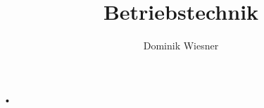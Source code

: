 \documentclass[12pt,a4paper]{article}
\author{Dominik Wiesner}
\title{Betriebstechnik}
\begin{document}
 •
 
\end{document}
